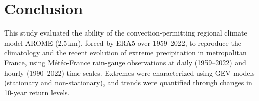 \documentclass[hess, manuscript]{copernicus}
\begin{document}





\section{Conclusion}\label{conclusion}

This study evaluated the ability of the convection-permitting regional climate model AROME (2.5\,km), forced by ERA5 over 1959--2022, to reproduce the climatology and the recent evolution of extreme precipitation in metropolitan France, using Météo-France rain-gauge observations at daily (1959--2022) and hourly (1990--2022) time scales. Extremes were characterized using GEV models (stationary and non-stationary), and trends were quantified through changes in 10-year return levels.

\end{document}
